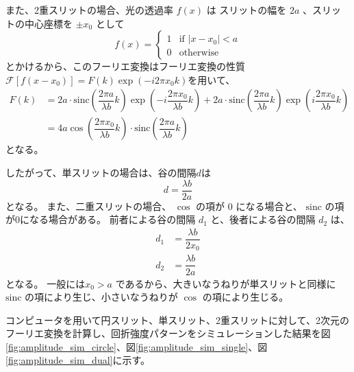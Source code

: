 \documentclass[../../../main]{subfiles}
\begin{document}
また、2重スリットの場合、光の透過率 \( f(x) \) は スリットの幅を \( 2a \) 、スリットの中心座標を \( \pm x_0 \) として
\begin{equation}
	f(x) =
	\begin{cases}
		1 & \text{if } |x - x_0| < a \\
		0 & \text{otherwise}
	\end{cases}
\end{equation}
とかけるから、このフーリエ変換はフーリエ変換の性質\( \mathcal{F}[f(x-x_0)] = F(k)\exp \left( -i 2 \pi x_0 k \right) \)を用いて、
\begin{equation}\label{eq:double_slit_ft}
	\begin{aligned}
		F(k) & = 2a \cdot \mathrm{sinc} \left( \dfrac{2\pi a}{\lambda b} k  \right) \exp \left( -i \dfrac{2 \pi x_0}{\lambda b}  k \right) + 2a \cdot \mathrm{sinc} \left( \dfrac{2\pi a}{\lambda b} k  \right) \exp \left( i \dfrac{2 \pi x_0}{\lambda b}  k \right) \\
		     & = 4a \cos \left( \dfrac{2 \pi x_0}{\lambda b} k \right) \cdot \mathrm{sinc} \left( \dfrac{2\pi a}{\lambda b} k  \right)
	\end{aligned}
\end{equation}
となる。

したがって、単スリットの場合は、谷の間隔\( d \)は
\begin{equation}\label{eq:single_slit_d}
	d = \dfrac{\lambda b}{2a}
\end{equation}
となる。
また、二重スリットの場合、 \( \cos  \) の項が \( 0 \) になる場合と、 \( \mathrm{sinc}  \) の項が0になる場合がある。
前者による谷の間隔 \( d_1 \) と、後者による谷の間隔 \( d_2 \) は、
\begin{equation}\label{eq:double_slit_d}
	\begin{aligned}
		d_1 & = \dfrac{\lambda b}{2x_0} \\
		d_2 & = \dfrac{\lambda b}{2a}
	\end{aligned}
\end{equation}
となる。
一般には\( x_0 > a \) であるから、大きいなうねりが単スリットと同様に \( \mathrm{sinc} \) の項により生じ、小さいなうねりが \( \cos \) の項により生じる。


コンピュータを用いて円スリット、単スリット、2重スリットに対して、2次元のフーリエ変換を計算し、回折強度パターンをシミュレーションした結果を図\ref{fig:amplitude_sim_circle}、図\ref{fig:amplitude_sim_single}、図\ref{fig:amplitude_sim_dual}に示す。



\end{document}
